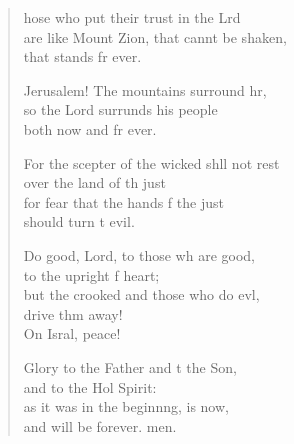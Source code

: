 \begin{verse}
  \begin{patverse}
hose who put their trust in the Lrd\Flex\\
are like Mount Zion, that cannt be shaken,\Med\\
that stands fr ever.

Jerusalem! The mountains surround hr,\Flex\\
so the Lord surrunds his people\Med\\
both now and fr ever.

For the scepter of the wicked shll not rest\Med\\
over the land of th just\\
for fear that the hands f the just\Med\\
should turn t evil.

Do good, Lord, to those wh are good,\Med\\
to the upright f heart;\\
but the crooked and those who do ev\pointup{\i}l,\Flex\\
drive thm away!\Med\\
On Isral, peace!

Glory to the Father and t the Son,\Med\\
and to the Hol Spirit:\\
as it was in the beginn\pointup{\i}ng, is now,\Med\\
and will be forever. men.
  \end{patverse}
\end{verse}
